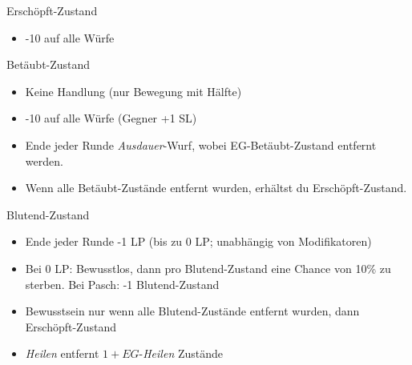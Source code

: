 \documentclass{article}
\begin{document}
\begin{multicols*}{3}
        


    \begin{slsframe}{Erschöpft-Zustand}
        \begin{itemize}
            \setlength\itemsep{-0.2em}
            \item -10 auf alle Würfe
        \end{itemize}        
    \end{slsframe}

    \begin{slsframe}{Betäubt-Zustand}
        \begin{itemize}
            \setlength\itemsep{-0.2em}
            \item Keine Handlung (nur Bewegung mit Hälfte)
            \item -10 auf alle Würfe (Gegner +1 SL)
            \item Ende jeder Runde \textit{Ausdauer}-Wurf, wobei EG-Betäubt-Zustand entfernt werden.
            \item Wenn alle Betäubt-Zustände entfernt wurden, erhältst du Erschöpft-Zustand.
        \end{itemize}
    \end{slsframe}

    \begin{slsframe}{Blutend-Zustand}
        \begin{itemize}
            \setlength\itemsep{-0.2em}
            \item Ende jeder Runde -1 LP (bis zu 0 LP; unabhängig von Modifikatoren)
            \item Bei 0 LP: Bewusstlos, dann pro Blutend-Zustand eine Chance von 10\% zu sterben. Bei Pasch: -1 Blutend-Zustand
            \item Bewusstsein nur wenn alle Blutend-Zustände entfernt wurden, dann Erschöpft-Zustand
            \item \textit{Heilen} entfernt $1 + EG$-\textit{Heilen} Zustände
        \end{itemize}        
    \end{slsframe}




\end{multicols*}
\end{document}
